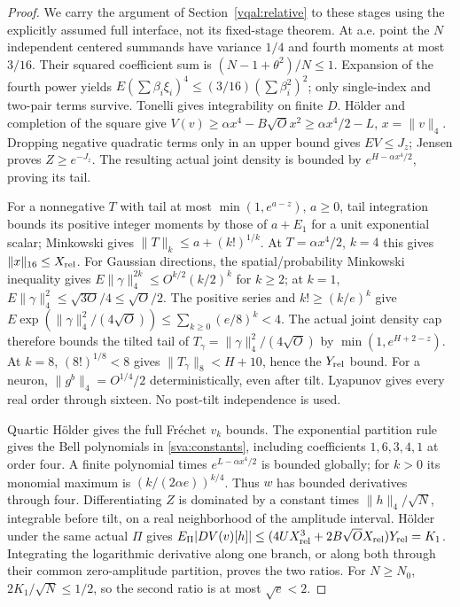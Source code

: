 \begin{proof}
We carry the argument of Section~\ref{vqal:relative} to these stages
using the explicitly assumed full interface, not its fixed-stage theorem.
At a.e. point the $N$ independent centered summands have variance $1/4$
and fourth moments at most $3/16$. Their squared coefficient sum is
$(N-1+\theta^2)/N\le1$. Expansion of the fourth power yields
$E(\sum\beta_i\xi_i)^4\le(3/16)(\sum\beta_i^2)^2$; only single-index
and two-pair terms survive. Tonelli gives integrability on finite $D$.
H\"older and completion of the square give
$V(v)\ge\alpha x^4-B\sqrt O x^2\ge\alpha x^4/2-L$, $x=\|v\|_4$.
Dropping negative quadratic terms only in an upper bound gives
$EV\le J_z$; Jensen proves $Z\ge e^{-J_z}$. The resulting actual
joint density is bounded by $e^{H-\alpha x^4/2}$, proving its tail.

For a nonnegative $T$ with tail at most $\min(1,e^{a-z})$, $a\ge0$,
tail integration bounds its positive integer moments by those of
$a+E_1$ for a unit exponential scalar; Minkowski gives
$\|T\|_k\le a+(k!)^{1/k}$. At $T=\alpha x^4/2$, $k=4$ this gives
$\|x\|_{16}\le X_{\rm rel}$. For Gaussian directions, the
spatial/probability Minkowski inequality gives
$E\|\gamma\|_4^{2k}\le O^{k/2}(k/2)^k$ for $k\ge2$; at $k=1$,
$E\|\gamma\|_4^2\le\sqrt{3O}/4\le\sqrt O/2$.
The positive series and $k!\ge(k/e)^k$ give
$E\exp(\|\gamma\|_4^2/(4\sqrt O))\le\sum_{k\ge0}(e/8)^k<4$.
The actual joint density cap therefore bounds the tilted tail of
$T_\gamma=\|\gamma\|_4^2/(4\sqrt O)$ by
$\min(1,e^{H+2-z})$. At $k=8$, $(8!)^{1/8}<8$ gives
$\|T_\gamma\|_8<H+10$, hence the $Y_{\rm rel}$ bound.
For a neuron, $\|g^b\|_4=O^{1/4}/2$ deterministically, even after tilt.
Lyapunov gives every real order through sixteen. No post-tilt
independence is used.

Quartic H\"older gives the full Fr\'echet $v_k$ bounds. The exponential
partition rule gives the Bell polynomials in \eqref{sva:constants},
including coefficients $1,6,3,4,1$ at order four. A finite polynomial
times $e^{L-\alpha x^4/2}$ is bounded globally; for $k>0$ its monomial
maximum is $(k/(2\alpha e))^{k/4}$. Thus $w$ has bounded derivatives
through four. Differentiating $Z$ is dominated by a constant times
$\|h\|_4/\sqrt N$, integrable before tilt, on a real neighborhood of
the amplitude interval. H\"older under the same actual $\Pi$ gives
$E_\Pi|DV(v)[h]|\le(4UX_{\rm rel}^3+2B\sqrt O X_{\rm rel})Y_{\rm rel}=K_1$.
Integrating the logarithmic derivative along one branch, or along both
through their common zero-amplitude partition, proves the two ratios.
For $N\ge N_0$, $2K_1/\sqrt N\le1/2$, so the second ratio is at most
$\sqrt e<2$.


\end{proof}
